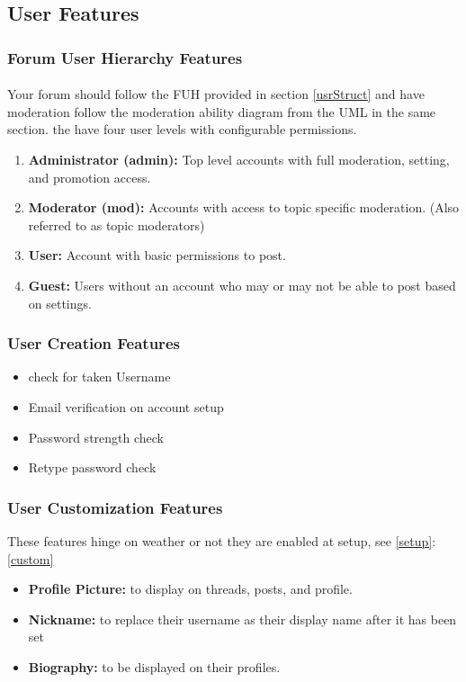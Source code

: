 \documentclass[]{article}
\begin{document}
\subsection{User Features}
\subsubsection{Forum User Hierarchy Features}
\paragraph{}
Your forum should follow the FUH provided in section \ref{usrStruct} and have moderation follow the moderation ability diagram from the UML in the same section. the have four user levels with configurable permissions.
\begin{enumerate}
    \item \textbf{Administrator (admin):} Top level accounts with full moderation, setting, and promotion access.
    \item \textbf{Moderator (mod):} Accounts with access to topic specific moderation. (Also referred to as topic moderators)
    \item \textbf{User:} Account with basic permissions to post.
    \item \textbf{Guest:} Users without an account who may or may not be able to post based on settings. 
\end{enumerate}

\subsubsection{User Creation Features}\label{UCF}
\begin{itemize}
    \item check for taken Username
    \item Email verification on account setup
    \item Password strength check
    \item Retype password check 
\end{itemize}

\subsubsection{User Customization Features}
These features hinge on weather or not they are enabled at setup, see \ref{setup}:\ref{custom}
\begin{itemize}
    \item \textbf{Profile Picture:} to display on threads, posts, and profile.
    \item \textbf{Nickname:} to replace their username as their display name after it has been set
    \item \textbf{Biography:} to be displayed on their profiles.
\end{itemize}
\end{document}
